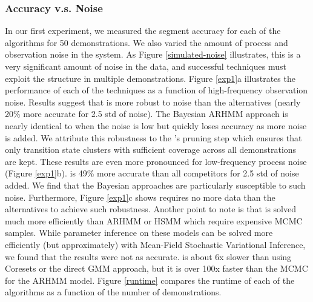 \subsubsection{Accuracy v.s. Noise}
In our first experiment, we measured the segment accuracy for each of the algorithms for 50 demonstrations.
We also varied the amount of process and observation noise in the system.
As Figure \ref{simulated-noise} illustrates, this is a very significant amount of noise in the data, and successful techniques must exploit the structure in multiple demonstrations.
Figure \ref{exp1}a illustrates the performance of each of the techniques as a function of high-frequency observation noise.
Results suggest that \tsc is more robust to noise than the alternatives (nearly 20\% more accurate for 2.5 std of noise).
The Bayesian ARHMM approach is nearly identical to \tsc when the noise is low but quickly loses accuracy as more noise is added.
We attribute this robustness to the \tsc's pruning step which ensures that only transition state clusters with sufficient coverage across all demonstrations are kept.
These results are even more pronounced for low-frequency process noise (Figure \ref{exp1}b). \tsc is 49\% more accurate than all competitors for 2.5 std of noise added.
We find that the Bayesian approaches are particularly susceptible to such noise.
Furthermore, Figure \ref{exp1}c shows \tsc requires no more data than the alternatives to achieve such robustness.
Another point to note is that \tsc is solved much more efficiently than ARHMM or HSMM which require expensive MCMC samples.
While parameter inference on these models can be solved more efficiently (but approximately) with Mean-Field Stochastic Variational Inference, we found that the results were not as accurate.
\tsc is about 6x slower than using Coresets or the direct GMM approach, but it is over 100x faster than the MCMC for the ARHMM model.
Figure \ref{runtime} compares the runtime of each of the algorithms as a function of the number of demonstrations.

